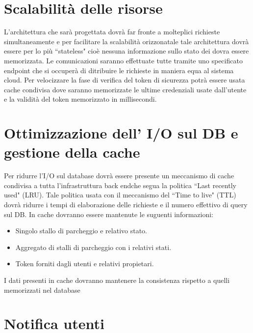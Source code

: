 \section{Scalabilità delle risorse}
L'architettura che sarà progettata dovrà far fronte a molteplici richieste simultaneamente e per facilitare la scalabilità orizzonatale tale architettura dovrà essere per lo più ``stateless" cioè nessuna informazione sullo stato dei dovra essere memorizzata. Le comunicazioni saranno effettuate tutte tramite uno specificato endpoint che si occuperà di ditribuire le richieste in maniera equa al sistema cloud. Per velocizzare la fase di verifica del token di sicurezza potrà essere usata cache condivisa dove saranno memorizzate le ultime credenziali usate dall'utente e la validità del token memorizzato in millisecondi. 



\section{Ottimizzazione dell' I/O sul DB e gestione della cache}
Per ridurre l'I/O sul database dovrà essere presente un meccanismo di cache condivisa a tutta l'infrastruttura back endche segua la politica ``Last recently used" (LRU). Tale politica usata con il meccanismo del ``Time to live" (TTL) dovrà ridurre i tempi di elaborazione delle richieste e il numero effettivo di query sul DB. In cache dovranno essere mantenute le suguenti informazioni:

\begin{itemize}
	\item Singolo stallo di parcheggio e relativo stato.
	\item Aggregato di stalli di parcheggio con i relativi stati.
	\item Token forniti dagli utenti e relativi propietari.
\end{itemize}

I dati presenti in cache dovranno mantenere la consistenza rispetto a quelli memorizzati nel database 


\section{Notifica utenti} 



